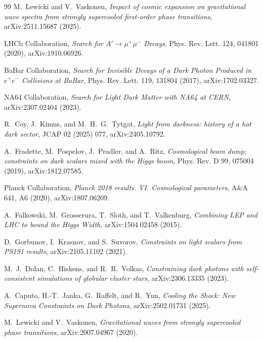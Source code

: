 \documentclass[a4paper,11pt]{article}
\begin{document}
\begin{thebibliography}{99}
M.~Lewicki and V.~Vaskonen,
\emph{Impact of cosmic expansion on gravitational wave spectra from strongly supercooled first-order phase transitions},
arXiv:2511.15687 (2025).

LHCb Collaboration,
\emph{Search for $A'\to\mu^+\mu^-$ Decays},
Phys. Rev. Lett. 124, 041801 (2020), arXiv:1910.06926.

BaBar Collaboration,
\emph{Search for Invisible Decays of a Dark Photon Produced in $e^+e^-$ Collisions at BaBar},
Phys. Rev. Lett. 119, 131804 (2017), arXiv:1702.03327.

NA64 Collaboration,
\emph{Search for Light Dark Matter with NA64 at CERN},
arXiv:2307.02404 (2023).

R.~Coy, J.~Kimus, and M.~H.~G.~Tytgat,
\emph{Light from darkness: history of a hot dark sector},
JCAP 02 (2025) 077, arXiv:2405.10792.

A.~Fradette, M.~Pospelov, J.~Pradler, and A.~Ritz,
\emph{Cosmological beam dump: constraints on dark scalars mixed with the Higgs boson},
Phys. Rev. D 99, 075004 (2019), arXiv:1812.07585.

Planck Collaboration,
\emph{Planck 2018 results. VI. Cosmological parameters},
A\&A 641, A6 (2020), arXiv:1807.06209.

A.~Falkowski, M.~Grosserura, T.~Sloth, and T.~Valkenburg,
\emph{Combining LEP and LHC to bound the Higgs Width},
arXiv:1504.02458 (2015).

D.~Gorbunov, I.~Krasnov, and S.~Suvorov,
\emph{Constraints on light scalars from PS191 results},
arXiv:2105.11102 (2021).

M.~J.~Dolan, C.~Hiskens, and R.~R.~Volkas,
\emph{Constraining dark photons with self-consistent simulations of globular cluster stars},
arXiv:2306.13335 (2023).

A.~Caputo, H.-T.~Janka, G.~Raffelt, and R.~Yun,
\emph{Cooling the Shock: New Supernova Constraints on Dark Photons},
arXiv:2502.01731 (2025).

M.~Lewicki and V.~Vaskonen,
\emph{Gravitational waves from strongly supercooled phase transitions},
arXiv:2007.04967 (2020).

\end{thebibliography}
\end{document}
